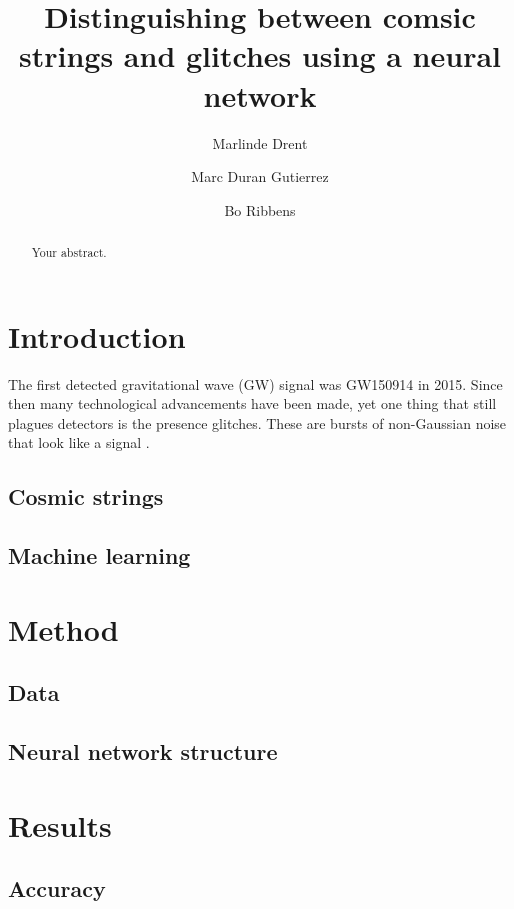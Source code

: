 \documentclass{article}
\title{\bf{Distinguishing between comsic strings and glitches using a neural network}}
\author[1]{Marlinde Drent}
\author[1]{Marc Duran Gutierrez}
\author[1]{Bo Ribbens}
\affil[1]{\it{Department of Physics, Utrecht University}}
\newcommand\C[1]\null
\begin{document}
\maketitle

\begin{abstract}
Your abstract.
\end{abstract}

\begin{multicols}{2}
\section{Introduction}
The first detected gravitational wave (GW) signal was GW150914\cite{PhysRevLett.116.061102} in 2015. 
Since then many technological advancements have been made, yet one thing that still plagues detectors is the presence glitches.    
These are bursts of non-Gaussian noise that look like a signal \C{Needs citation}.

\subsection{Cosmic strings}

\subsection{Machine learning}


\section{Method}
\subsection{Data}

\subsection{Neural network structure}

\section{Results}
\subsection{Accuracy}


\end{multicols}
\end{document}
